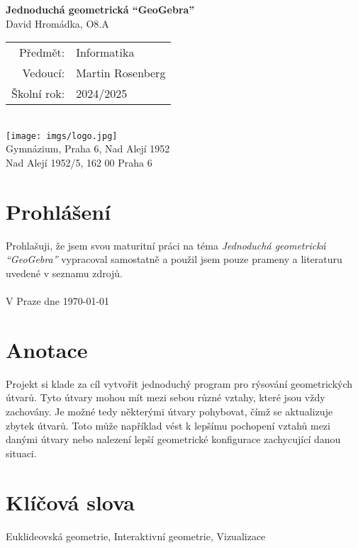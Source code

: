\documentclass[11pt]{article}
\begin{document}
    \pagestyle{empty}
    \hspace{0pt}\vfill\vspace{-10pt}
        \begin{center}
            {\Huge \bfseries Jednoduchá geometrická \enquote{GeoGebra} }\\[2ex]
            {\large  David Hromádka, O8.A}\\[8ex]
            \begin{tabular}{rl}
                Předmět:& Informatika\\
                Vedoucí:& Martin Rosenberg\\
                Školní rok:& 2024/2025
            \end{tabular}\\[8ex]
            \texttt{[image: imgs/logo.jpg]}\\[6ex]
            {Gymnázium, Praha 6, Nad Alejí 1952}\\
            {Nad Alejí 1952/5, 162 00 Praha 6}
        \end{center}
    \hspace{0pt}\vfill
    \newpage
    \restoregeometry

    
    \newpage

    \section*{Prohlášení}
    Prohlašuji, že jsem svou maturitní práci na téma \textit{Jednoduchá geometrická \enquote{GeoGebra}} vypracoval samostatně a použil jsem pouze prameny a literaturu uvedené v seznamu zdrojů.\\\\
    V Praze dne \today\dotfill
    \newpage

    \section*{Anotace}
    Projekt si klade za cíl vytvořit jednoduchý program pro rýsování geometrických útvarů. Tyto útvary mohou mít mezi sebou různé vztahy, které jsou vždy zachovány. Je možné tedy některými útvary pohybovat, čímž se aktualizuje zbytek útvarů. Toto může například vést k lepšímu pochopení vztahů mezi danými útvary nebo nalezení lepší geometrické konfigurace zachycující danou situaci.
    \section*{Klíčová slova}
    Euklideovská geometrie, Interaktivní geometrie, Vizualizace
\end{document}
